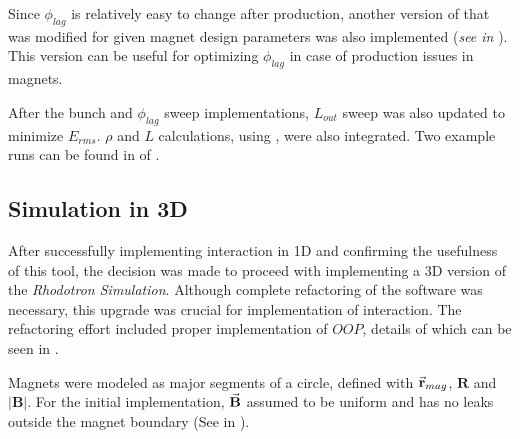 \documentclass[a4paper,oneside,12pt]{report}
\numberwithin{equation}{chapter}
\begin{document}
Since $\phi_{lag}$ is relatively easy to change after production, another version of  that was modified for given magnet design parameters was also implemented (\textit{see  in }). 
This version can be useful for optimizing $\phi_{lag}$ in case of production issues in magnets. 

After the bunch and $\phi_{lag}$ sweep implementations, $L_{out}$ sweep was also updated to minimize $E_{rms}$. $\rho$ and $L$ calculations, using , were also integrated. 
Two example runs can be found in  of .

\subsection{Simulation in 3D}
After successfully implementing \eE interaction in 1D and confirming the usefulness of this tool, the decision was made to proceed with implementing a 3D version of the \textit{Rhodotron Simulation}.
Although complete refactoring of the software was necessary, this upgrade was crucial for implementation of \eB interaction.
The refactoring effort included proper implementation of $OOP$, details of which can be seen in .

Magnets were modeled as major segments of a circle, defined with $\vec{\textbf{r}}_{mag}$, $\textbf{R}$ and $|\textbf{B}|$. 
For the initial implementation, $\vec{\textbf{B}}$ assumed to be uniform and has no leaks outside the magnet boundary (See  in ).
\end{document}
